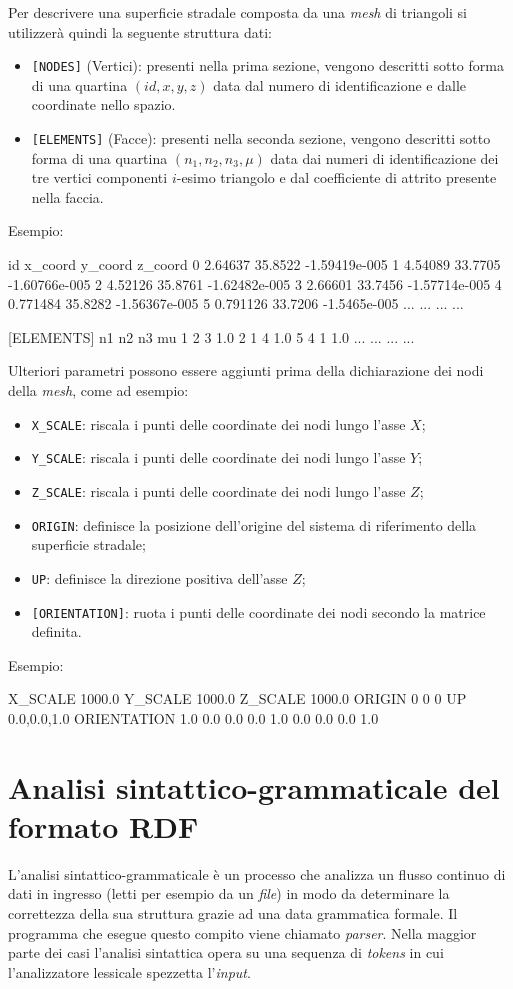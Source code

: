 Per descrivere una superficie stradale composta da una \textit{mesh} di triangoli si utilizzerà quindi la seguente struttura dati:
\begin{itemize}
	\item \texttt{[NODES]} (Vertici): presenti nella prima sezione, vengono descritti sotto forma di una quartina $(id,x,y,z)$ data dal numero di identificazione e dalle coordinate nello spazio.
	\item \texttt{[ELEMENTS]} (Facce): presenti nella seconda sezione, vengono descritti sotto forma di una quartina $(n_1,n_2,n_3,\mu)$ data dai numeri di identificazione dei tre vertici componenti $i$-esimo triangolo e dal coefficiente di attrito presente nella faccia.
\end{itemize}
Esempio:
\begin{pseudoc}
	[NODES]
	{ id x_coord y_coord z_coord }
	0 2.64637 35.8522 -1.59419e-005 
	1 4.54089 33.7705 -1.60766e-005 
	2 4.52126 35.8761 -1.62482e-005 
	3 2.66601 33.7456 -1.57714e-005 
	4 0.771484 35.8282 -1.56367e-005 
	5 0.791126 33.7206 -1.5465e-005
	... ... ... ...
	
	[ELEMENTS]
	{ n1 n2 n3 mu }
	1 2 3 1.0 
	2 1 4 1.0 
	5 4 1 1.0 
	... ... ... ...
\end{pseudoc}
Ulteriori parametri possono essere aggiunti prima della dichiarazione dei nodi della \textit{mesh}, come ad esempio:
\begin{itemize}
	\item \texttt{X\_SCALE}: riscala i punti delle coordinate dei nodi lungo l'asse $X$;
	\item \texttt{Y\_SCALE}: riscala i punti delle coordinate dei nodi lungo l'asse $Y$;
	\item \texttt{Z\_SCALE}: riscala i punti delle coordinate dei nodi lungo l'asse $Z$;
	\item \texttt{ORIGIN}: definisce la posizione dell'origine del sistema di riferimento della superficie stradale;
	\item \texttt{UP}: definisce la direzione positiva dell'asse $Z$;
	\item \texttt{[ORIENTATION]}: ruota i punti delle coordinate dei nodi secondo la matrice definita.
\end{itemize}
Esempio:
\begin{pseudoc}
	X_SCALE
	1000.0
	Y_SCALE
	1000.0
	Z_SCALE
	1000.0
	ORIGIN
	0 0 0
	UP
	0.0,0.0,1.0
	ORIENTATION
	1.0  0.0  0.0
	0.0  1.0  0.0
	0.0  0.0  1.0
\end{pseudoc}
%
\section{Analisi sintattico-grammaticale del formato RDF}
%
L'analisi sintattico-grammaticale è un processo che analizza un flusso continuo di dati in ingresso (letti per esempio da un \textit{file}) in modo da determinare la correttezza della sua struttura grazie ad una data grammatica formale. Il programma che esegue questo compito viene chiamato \textit{parser}. Nella maggior parte dei casi l'analisi sintattica opera su una sequenza di \textit{tokens} in cui l'analizzatore lessicale spezzetta l'\textit{input}.

